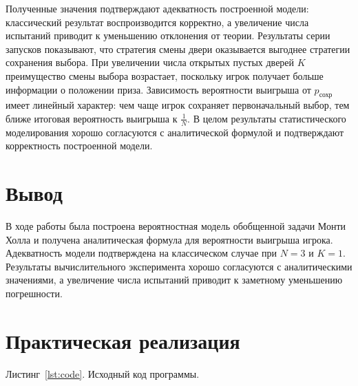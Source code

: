 \documentclass[a4paper, 14pt]{extarticle}
\begin{document}
Полученные значения подтверждают адекватность построенной модели: классический результат воспроизводится корректно, а увеличение числа испытаний приводит к уменьшению отклонения от теории. Результаты серии запусков показывают, что стратегия смены двери оказывается выгоднее стратегии сохранения выбора. При увеличении числа открытых пустых дверей $K$ преимущество смены выбора возрастает, поскольку игрок получает больше информации о положении приза. Зависимость вероятности выигрыша от $p_{\text{сохр}}$ имеет линейный характер: чем чаще игрок сохраняет первоначальный выбор, тем ближе итоговая вероятность выигрыша к $\frac{1}{N}$. В целом результаты статистического моделирования хорошо согласуются с аналитической формулой и подтверждают корректность построенной модели.

\section{Вывод}

В ходе работы была построена вероятностная модель обобщенной задачи Монти Холла и получена аналитическая формула для вероятности выигрыша игрока. Адекватность модели подтверждена на классическом случае при $N = 3$ и $K = 1$. Результаты вычислительного эксперимента хорошо согласуются с аналитическими значениями, а увеличение числа испытаний приводит к заметному уменьшению погрешности.

\section{Практическая реализация}

\label{lst:code}
\noindent Листинг~\ref{lst:code}. Исходный код программы.


\end{document}
